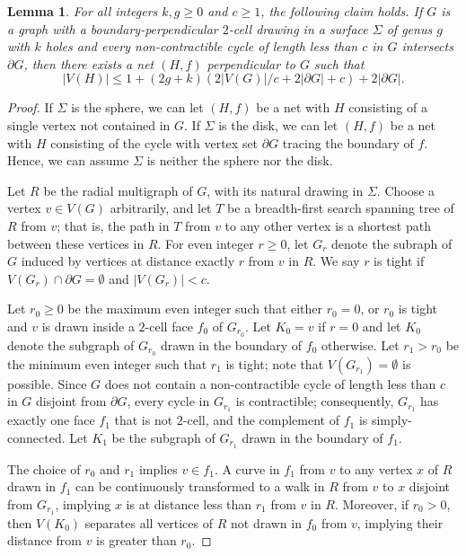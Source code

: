 \documentclass[12pt,twoside,openright,a4paper]{book}
\newtheorem{lemma}[theorem]{Lemma}
\begin{document}
\begin{lemma}\label{lemma-linnet}
For all integers $k,g\ge 0$ and $c\ge 1$, the following claim holds.
If $G$ is a graph with a boundary-perpendicular $2$-cell drawing in a surface $\Sigma$ of genus $g$ with $k$ holes
and every non-contractible cycle of length less than $c$ in $G$ intersects $\partial G$, then
there exists a net $(H,f)$ perpendicular to $G$ such that
$$|V(H)|\le 1+(2g+k)(2|V(G)|/c+2|\partial G|+c)+2|\partial G|.$$
\end{lemma}
\begin{proof}
If $\Sigma$ is the sphere,  we can let $(H,f)$ be a net with $H$ consisting of a single vertex not contained in $G$.
If $\Sigma$ is the disk, we can let $(H,f)$ be a net with $H$ consisting of the cycle with vertex set $\partial G$
tracing the boundary of $f$. Hence, we can assume $\Sigma$ is neither the sphere nor the disk.

Let $R$ be the radial multigraph of $G$, with its natural drawing in $\Sigma$.
Choose a vertex $v\in V(G)$ arbitrarily, and let $T$ be a breadth-first search spanning tree of $R$ from $v$;
that is, the path in $T$ from $v$ to any other vertex is a shortest path between these vertices in $R$.
For even integer $r\ge 0$, let $G_r$ denote the subraph of $G$ induced by vertices at distance exactly $r$ from $v$ in $R$.
We say $r$ is tight if $V(G_r)\cap \partial G=\emptyset$ and $|V(G_r)|<c$.

Let $r_0\ge 0$ be the maximum even integer such that either $r_0=0$, or $r_0$ is tight and $v$ is drawn inside a $2$-cell
face $f_0$ of $G_{r_0}$.  Let $K_0=v$ if $r=0$ and let $K_0$ denote the subgraph of $G_{r_0}$ drawn in the boundary of $f_0$ otherwise.
Let $r_1>r_0$ be the minimum even integer such that $r_1$ is tight; note that $V(G_{r_1})=\emptyset$ is possible.
Since $G$ does not contain a non-contractible cycle of length less than $c$ in $G$ disjoint from $\partial G$,
every cycle in $G_{r_1}$ is contractible; consequently, $G_{r_1}$ has exactly one face $f_1$ that is not $2$-cell,
and the complement of $f_1$ is simply-connected.  Let $K_1$ be the subgraph of $G_{r_1}$ drawn in the boundary of $f_1$.

The choice of $r_0$ and $r_1$ implies $v\in f_1$.
A curve in $f_1$ from $v$ to any vertex $x$ of $R$ drawn in $f_1$ can be continuously transformed to a
walk in $R$ from $v$ to $x$ disjoint from $G_{r_1}$, implying $x$ is at distance less than $r_1$ from $v$ in $R$.
Moreover, if $r_0>0$, then $V(K_0)$ separates all vertices of $R$ not drawn in $f_0$ from $v$, implying
their distance from $v$ is greater than $r_0$.


\end{proof}
\end{document}
